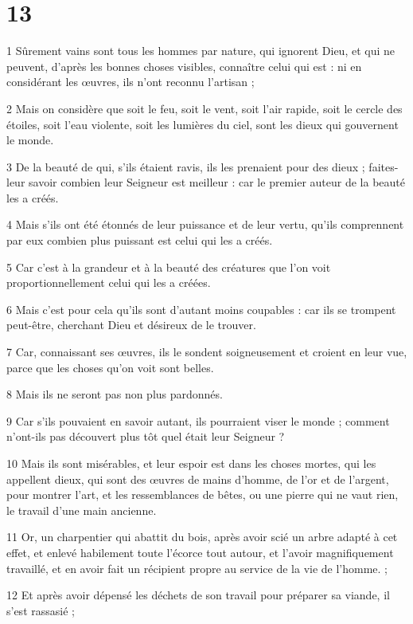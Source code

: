 \chapter{13}

\par 1 Sûrement vains sont tous les hommes par nature, qui ignorent Dieu, et qui ne peuvent, d'après les bonnes choses visibles, connaître celui qui est : ni en considérant les œuvres, ils n'ont reconnu l'artisan ;
\par 2 Mais on considère que soit le feu, soit le vent, soit l'air rapide, soit le cercle des étoiles, soit l'eau violente, soit les lumières du ciel, sont les dieux qui gouvernent le monde.
\par 3 De la beauté de qui, s'ils étaient ravis, ils les prenaient pour des dieux ; faites-leur savoir combien leur Seigneur est meilleur : car le premier auteur de la beauté les a créés.
\par 4 Mais s'ils ont été étonnés de leur puissance et de leur vertu, qu'ils comprennent par eux combien plus puissant est celui qui les a créés.
\par 5 Car c'est à la grandeur et à la beauté des créatures que l'on voit proportionnellement celui qui les a créées.
\par 6 Mais c'est pour cela qu'ils sont d'autant moins coupables : car ils se trompent peut-être, cherchant Dieu et désireux de le trouver.
\par 7 Car, connaissant ses œuvres, ils le sondent soigneusement et croient en leur vue, parce que les choses qu'on voit sont belles.
\par 8 Mais ils ne seront pas non plus pardonnés.
\par 9 Car s'ils pouvaient en savoir autant, ils pourraient viser le monde ; comment n'ont-ils pas découvert plus tôt quel était leur Seigneur ?
\par 10 Mais ils sont misérables, et leur espoir est dans les choses mortes, qui les appellent dieux, qui sont des œuvres de mains d'homme, de l'or et de l'argent, pour montrer l'art, et les ressemblances de bêtes, ou une pierre qui ne vaut rien, le travail d'une main ancienne.
\par 11 Or, un charpentier qui abattit du bois, après avoir scié un arbre adapté à cet effet, et enlevé habilement toute l'écorce tout autour, et l'avoir magnifiquement travaillé, et en avoir fait un récipient propre au service de la vie de l'homme. ;
\par 12 Et après avoir dépensé les déchets de son travail pour préparer sa viande, il s'est rassasié ;
